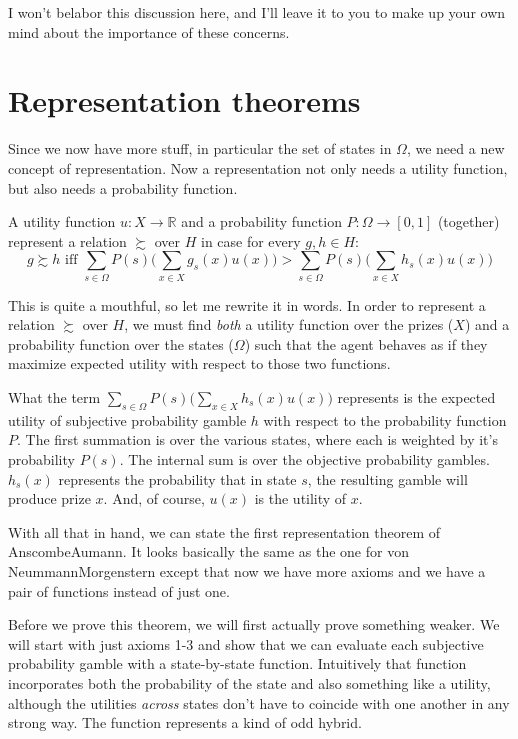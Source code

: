 I won't belabor this discussion here, and I'll leave it to you to make up your own mind about the importance of these concerns.


\section{Representation theorems}

Since we now have more stuff, in particular the set of states in $\Omega$, we need a new concept of representation.  Now a representation not only needs a utility function, but also needs a probability function.  

\begin{definition}
A utility function $u: X \to \mathbb{R}$ and a probability function $P: \Omega \to [0,1]$ (together) represent a relation $\succsim$ over $H$ in case for every $g, h \in H$:
\begin{equation*}
g \succsim h \text{ iff } \sum_{s \in \Omega} P(s) \big( \sum_{x \in X} g_s(x) u(x)\big) > \sum_{s \in \Omega} P(s) \big( \sum_{x \in X} h_s(x) u(x)\big)
\end{equation*}
\end{definition}

This is quite a mouthful, so let me rewrite it in words.  In order to represent a relation $\succsim$ over $H$, we must find {\it both} a utility function over the prizes ($X$) and a probability function over the states ($\Omega$) such that the agent behaves as if they maximize expected utility with respect to those two functions.

What the term $\sum_{s \in \Omega} P(s) \big( \sum_{x \in X} h_s(x) u(x)\big)$ represents is the expected utility of subjective probability gamble $h$ with respect to the probability function $P$. The first summation is over the various states, where each is weighted by it's probability $P(s)$.  The internal sum is over the objective probability gambles. $h_s(x)$ represents the probability that in state $s$, the resulting gamble will produce prize $x$.  And, of course, $u(x)$ is the utility of $x$.

With all that in hand, we can state the first representation theorem of Anscombe\breakslash Aumann. It looks basically the same as the one for von Neummann\breakslash Morgenstern except that now we have more axioms and we have a pair of functions instead of just one.

Before we prove this theorem, we will first actually prove something weaker.  We will start with just axioms 1-3 and show that we can evaluate each subjective probability gamble with a state-by-state function.  Intuitively that function incorporates both the probability of the state and also something like a utility, although the utilities {\it across} states don't have to coincide with one another in any strong way. The function represents a kind of odd hybrid.

